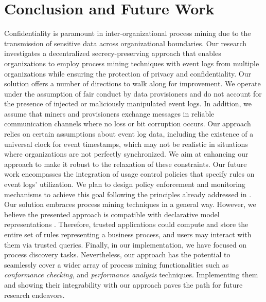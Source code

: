 \section{Conclusion and Future Work}
\label{sec:conclusion}
Confidentiality is paramount in inter-organizational process mining due to the transmission of sensitive data across organizational boundaries. Our research investigates a decentralized secrecy-preserving approach that enables organizations to employ process mining techniques with event logs from multiple organizations while ensuring the protection of privacy and confidentiality. Our solution offers a number of directions %
to walk along for improvement. We operate under the assumption of fair conduct by data provisioners and do not account for the presence of injected or maliciously manipulated event logs. In addition, we assume that miners and provisioners exchange messages in reliable communication channels where no loss or bit corruption occurs. Our approach relies on certain assumptions about event log data, including the existence of a universal clock for event timestamps, which may not be realistic in situations where organizations are not perfectly synchronized. %
We aim at enhancing our approach to make it robust to the relaxation of these constraints.  Our future work encompasses the integration of usage control policies that specify rules on event logs' utilization. We plan to design policy enforcement and monitoring mechanisms to achieve this goal following the principles already addressed in \citep{basile2023blockchain,basile2023solid}. Our solution embraces process mining techniques in a general way. However, we believe the presented approach is compatible with declarative model representations \citep{di2022declarative}. Therefore, trusted applications could compute and store the entire set of rules representing a business process, and users may interact with them via trusted queries. Finally, in our implementation, we have focused on process discovery tasks. Nevertheless, our approach has the potential to seamlessly cover a wider array of process mining functionalities such as \textit{conformance checking}, and \textit{performance analysis} techniques. Implementing them and showing their integrability with our approach paves the path for future research endeavors.


